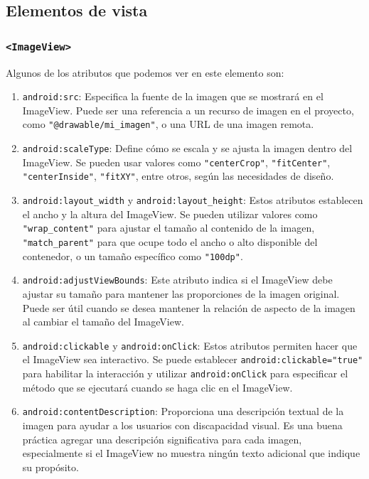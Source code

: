 \subsection{Elementos de vista}

\subsubsection{\texttt{<ImageView>}}

Algunos de los atributos que podemos ver en este elemento son:

\begin{enumerate}
\item \texttt{android:src}: Especifica la fuente de la imagen que se mostrará en el ImageView. Puede ser una referencia a un recurso de imagen en el proyecto, como \texttt{"@drawable/mi\_imagen"}, o una URL de una imagen remota.

\item \texttt{android:scaleType}: Define cómo se escala y se ajusta la imagen dentro del ImageView. Se pueden usar valores como \texttt{"centerCrop"}, \texttt{"fitCenter"}, \texttt{"centerInside"}, \texttt{"fitXY"}, entre otros, según las necesidades de diseño.

\item \texttt{android:layout\_width} y \texttt{android:layout\_height}: Estos atributos establecen el ancho y la altura del ImageView. Se pueden utilizar valores como \texttt{"wrap\_content"} para ajustar el tamaño al contenido de la imagen, \texttt{"match\_parent"} para que ocupe todo el ancho o alto disponible del contenedor, o un tamaño específico como \texttt{"100dp"}.

\item \texttt{android:adjustViewBounds}: Este atributo indica si el ImageView debe ajustar su tamaño para mantener las proporciones de la imagen original. Puede ser útil cuando se desea mantener la relación de aspecto de la imagen al cambiar el tamaño del ImageView.

\item \texttt{android:clickable} y \texttt{android:onClick}: Estos atributos permiten hacer que el ImageView sea interactivo. Se puede establecer \texttt{android:clickable="true"} para habilitar la interacción y utilizar \texttt{android:onClick} para especificar el método que se ejecutará cuando se haga clic en el ImageView.

\item \texttt{android:contentDescription}: Proporciona una descripción textual de la imagen para ayudar a los usuarios con discapacidad visual. Es una buena práctica agregar una descripción significativa para cada imagen, especialmente si el ImageView no muestra ningún texto adicional que indique su propósito.
\end{enumerate}

